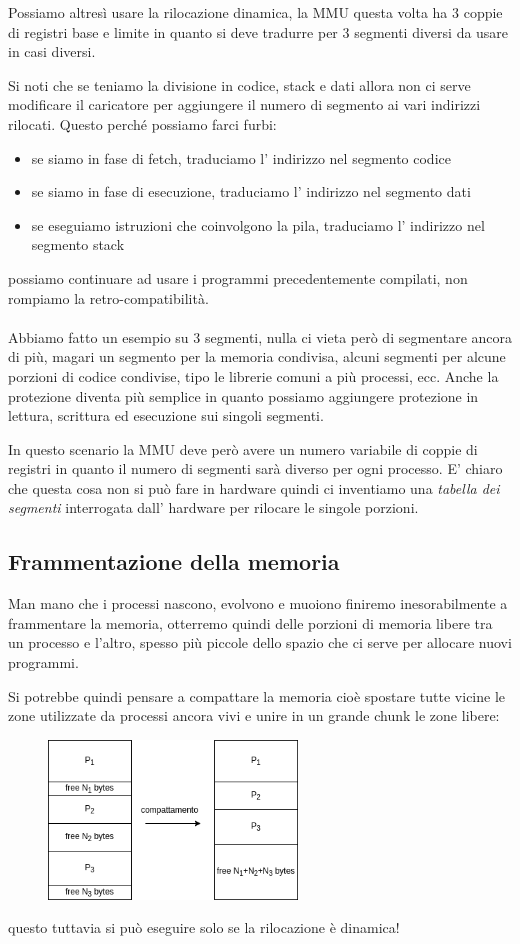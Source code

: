 Possiamo altresì usare la rilocazione dinamica, la MMU questa volta ha 3 coppie di registri base e limite in quanto si deve tradurre per 3 segmenti diversi da usare in casi diversi.

Si noti che se teniamo la divisione in codice, stack e dati allora non ci serve modificare il caricatore per aggiungere il numero di segmento ai vari indirizzi rilocati.
Questo perché possiamo farci furbi:
\begin{itemize}
    \item se siamo in fase di fetch, traduciamo l' indirizzo nel segmento codice
    \item se siamo in fase di esecuzione, traduciamo l' indirizzo nel segmento dati
    \item se eseguiamo istruzioni che coinvolgono la pila, traduciamo l' indirizzo nel segmento stack
\end{itemize}
possiamo continuare ad usare i programmi precedentemente compilati, non rompiamo la retro-compatibilità.
\\
\\
Abbiamo fatto un esempio su 3 segmenti, nulla ci vieta però di segmentare ancora di più, magari un segmento per la memoria condivisa, alcuni segmenti per alcune porzioni di codice condivise, tipo le librerie comuni a più processi, ecc.
Anche la protezione diventa più semplice in quanto possiamo aggiungere protezione in lettura, scrittura ed esecuzione sui singoli segmenti.

In questo scenario la MMU deve però avere un numero variabile di coppie di registri in quanto il numero di segmenti sarà diverso per ogni processo.
E' chiaro che questa cosa non si può fare in hardware quindi ci inventiamo una \emph{tabella dei segmenti} interrogata dall' hardware per rilocare le singole porzioni.

\subsection{Frammentazione della memoria}
Man mano che i processi nascono, evolvono e muoiono finiremo inesorabilmente a frammentare la memoria, otterremo quindi delle porzioni di memoria libere tra un processo e l'altro, spesso più piccole dello spazio che ci serve per allocare nuovi programmi.

Si potrebbe quindi pensare a compattare la memoria cioè spostare tutte vicine le zone utilizzate da processi ancora vivi e unire in un grande chunk le zone libere:
\begin{figure}[H]
    \centering
    \includegraphics[width=250px]{images/9_Gestione_della_memoria/compattamento.png}
\end{figure}
questo tuttavia si può eseguire solo se la rilocazione è dinamica!

